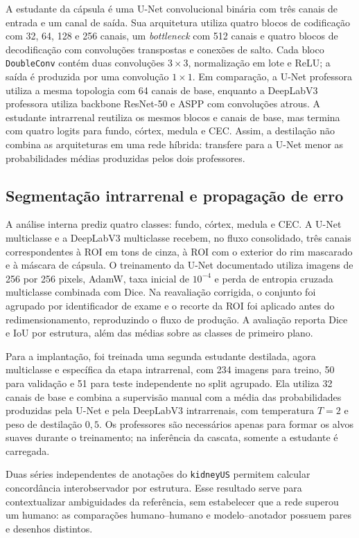 \documentclass[12pt]{article}
\begin{document}
A estudante da cápsula é uma U-Net convolucional binária com três canais de entrada e um
canal de saída. Sua arquitetura utiliza quatro blocos de codificação com 32,
64, 128 e 256 canais, um \textit{bottleneck} com 512 canais e quatro blocos de
decodificação com convoluções transpostas e conexões de salto. Cada bloco
\texttt{DoubleConv} contém duas convoluções $3\times3$, normalização em lote e
ReLU; a saída é produzida por uma convolução $1\times1$. Em comparação, a U-Net
professora utiliza a mesma topologia com 64 canais de base, enquanto a
DeepLabV3 professora utiliza backbone ResNet-50 e ASPP com convoluções
atrous. A estudante intrarrenal reutiliza os mesmos blocos e canais de base,
mas termina com quatro logits para fundo, córtex, medula e CEC. Assim, a
destilação não combina as arquiteturas em uma rede híbrida:
transfere para a U-Net menor as probabilidades médias produzidas pelos dois
professores.


\subsection{Segmentação intrarrenal e propagação de erro}

A análise interna prediz quatro classes: fundo, córtex, medula e CEC. A U-Net multiclasse e a DeepLabV3 multiclasse recebem, no fluxo consolidado, três canais correspondentes à ROI em tons de cinza, à ROI com o exterior do rim mascarado e à máscara de cápsula. O treinamento da U-Net documentado utiliza imagens de 256 por 256 pixels, AdamW, taxa inicial de $10^{-4}$ e perda de entropia cruzada multiclasse combinada com Dice. Na reavaliação corrigida, o conjunto foi agrupado por identificador de exame e o recorte da ROI foi aplicado antes do redimensionamento, reproduzindo o fluxo de produção. A avaliação reporta Dice e IoU por estrutura, além das médias sobre as classes de primeiro plano.

Para a implantação, foi treinada uma segunda estudante destilada, agora
multiclasse e específica da etapa intrarrenal, com 234 imagens para treino, 50
para validação e 51 para teste independente no split agrupado. Ela utiliza 32 canais de base e
combina a supervisão manual com a média das probabilidades produzidas pela
U-Net e pela DeepLabV3 intrarrenais, com temperatura $T=2$ e peso de
destilação $0{,}5$. Os professores são necessários apenas para formar os alvos
suaves durante o treinamento; na inferência da cascata, somente a estudante é
carregada.

Duas séries independentes de anotações do \texttt{kidneyUS} permitem calcular concordância interobservador por estrutura. Esse resultado serve para contextualizar ambiguidades da referência, sem estabelecer que a rede superou um humano: as comparações humano--humano e modelo--anotador possuem pares e desenhos distintos.
\end{document}
